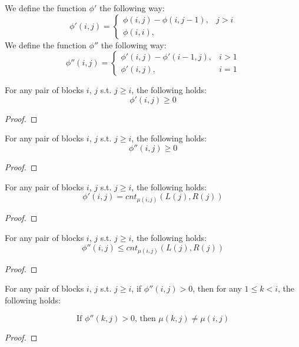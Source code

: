 \documentclass[runningheads]{llncs}
\begin{document}
We define the function $\phi'$ the following way: 
\[
     \phi'(i,j)=
     \begin{cases} 
        \phi(i,j)-\phi(i,j-1) , & j > i \\
        \phi(i,i) , &
    \end{cases}
\]
We define the function $\phi''$ the following way:
\[
    \phi''(i,j)=
    \begin{cases}
        \phi'(i,j)-\phi'(i-1,j) , & i>1 \\
        \phi'(i,j), & i=1
    \end{cases}
\]



\begin{lemma}
    For any pair of blocks $i$, $j$ s.t. $j\geq i$, the following holds: 
    \[
        \phi'(i,j)\geq 0
    \]
\end{lemma}
\begin{proof}
    
\end{proof}

\begin{lemma}
    For any pair of blocks $i$, $j$ s.t. $j\geq i$, the following holds:
    \[
        \phi''(i,j)\geq 0
    \]
\end{lemma}
\begin{proof}
    
\end{proof}

\begin{lemma}
    For any pair of blocks $i$, $j$ s.t. $j\geq i$, the following holds:
    \[
        \phi'(i,j) = cnt_{\mu(i,j)}(L(j), R(j))
    \]
\end{lemma}
\begin{proof}
    
\end{proof}


\begin{lemma}
    For any pair of blocks $i$, $j$ s.t. $j\geq i$, the following holds:
    \[
        \phi''(i,j) \leq cnt_{\mu(i,j)}(L(j), R(j))
    \]
\end{lemma}
\begin{proof}
    
\end{proof}

\begin{lemma}
    For any pair of blocks $i$, $j$ s.t. $j\geq i$, 
    if $\phi''(i,j)>0$, then for any $1\leq k<i$, the following holds:

    \[
        \text{If $\phi''(k,j)>0$, then $\mu(k,j)\neq \mu(i,j)$}
    \]
\end{lemma}
\begin{proof}
    
\end{proof}
\end{document}
